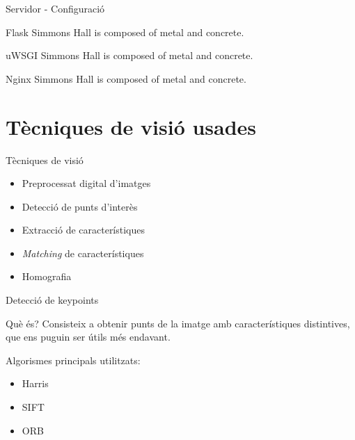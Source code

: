 \documentclass[xcolor=table, 11pt]{beamer}
\newcommand\tz{\fontsize{13}{15.6}\selectfont}
\begin{document}
	\begin{frame}{Servidor - Configuració}
		\tz
		\begin{alertblock}{Flask}
			Simmons Hall is composed of metal and concrete.
		\end{alertblock}
		\begin{alertblock}{uWSGI}
			Simmons Hall is composed of metal and concrete.
		\end{alertblock}
		\begin{alertblock}{Nginx}
			Simmons Hall is composed of metal and concrete.
		\end{alertblock}
	\end{frame}

\section{Tècniques de visió usades}

	\begin{frame}{Tècniques de visió}
		\tz
		\begin{itemize}
			\item Preprocessat digital d'imatges
			\item Detecció de punts d'interès
			\item Extracció de característiques
			\item \textit{Matching} de característiques
			\item Homografia
		\end{itemize}
	\end{frame}

	\begin{frame}{Detecció de keypoints}
		\tz
		\begin{block}{Què és?}
			Consisteix a obtenir punts de la imatge amb característiques distintives, que ens puguin ser útils més endavant.
		\end{block}
		Algorismes principals utilitzats:
		\begin{itemize}
			\item Harris\cite{Harris}
			\item SIFT\cite{SIFT}
			\item ORB\cite{Rublee:2011:OEA:2355573.2356268}
		\end{itemize}
	\end{frame}
\end{document}

